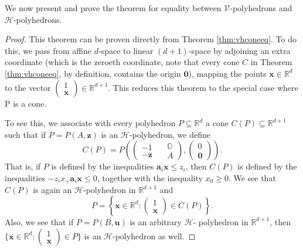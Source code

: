 		We now present and prove the theorem for equality between $\mathcal{V}$-polyhedrons and 
		$\mathcal{H}$-polyhedrons. 
		
		
		\begin{proof}
			This theorem can be proven directly from Theorem \ref{thm:vhconeeq}. 
			To do this, we pass from affine $d$-space to linear $(d+1)$-space by adjoining an 
			extra coordinate (which is the zeroeth coordinate, note that every cone $C$ in Theorem 
			\ref{thm:vhconeeq}, by definition, contains the origin $\boldsymbol{0}$), 
			mapping the points $\boldsymbol{x} \in \mathbb{R}^d$ to the vector 
			$\left(\substack{1 \\ \boldsymbol{x}} \right) \in \mathbb{R}^{d+1}$. 
			This reduces this theorem to the special case where P is a cone. 
			
			To see this, we associate with every polyhedron $P \subseteq \mathbb{R}^d$ a cone 
			$C(P) \subseteq \mathbb{R}^{d+1}$ such that if $P = P (A, \boldsymbol{z})$ is an 
			$\mathcal{H}$-polyhedron, we define 
			\[
			C(P) = P \left( \left( \substack{-1 \\ -\boldsymbol{z}} \quad \substack{\mathbb{O} \\ 
			A} \right), \left( \substack{0 \\ \boldsymbol{0}} \right) \right).
			\]
			That is, if $P$ is defined by the inequalities $\boldsymbol{a}_i \boldsymbol{x} \leq 
			z_i$, then $C(P)$ is defined by the inequalities $-z_i x_+ \boldsymbol{a}_i 
			\boldsymbol{x} \leq 0$, together with the inequality $x_0 \geq 0$. 
			We see that $C(P)$ is again an $\mathcal{H}$-polyhedron in $\mathbb{R}^{d+1}$ and 
			\[
			P = \left\{ \boldsymbol{x} \in \mathbb{R}^d : \left( \substack{1 \\ \boldsymbol{x}} 
			\right) \in C(P) \right\}.
			\]
			Also, we see that if $P = P(B, \boldsymbol{u})$ is an arbitrary $\mathcal{H}$-
			polyhedron in $\mathbb{R}^{d+1}$, then $\{\boldsymbol{x} \in \mathbb{R}^{d} : 
			\left( \substack{1 \\ \boldsymbol{x}} \right) \in P \}$ is an $\mathcal{H}$-polyhedron 
			as well.
			

\end{proof}
